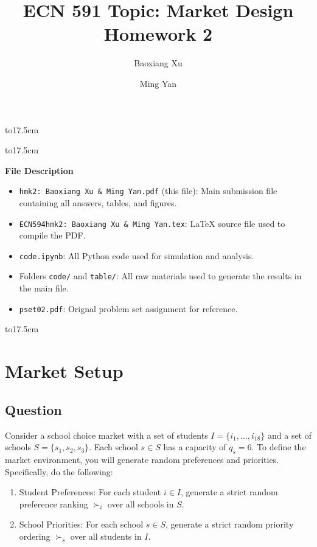 \documentclass[12pt,oneside]{article}
\begin{document}
\setlength{\columnwidth}{17.6cm}
\title{ECN 591 Topic: Market Design\\Homework 2}
\author{Baoxiang Xu \and Ming Yan}
\maketitle
\hbox to17.5cm{\hrulefill}\par
\maketitle
\hbox to17.5cm{\hrulefill}\par

\vspace{0.5cm}

\noindent
\textbf{File Description}

\vspace{0.2cm}

\noindent
\begin{itemize}
    \item \texttt{hmk2: Baoxiang Xu \& Ming Yan.pdf} (this file): Main submission file containing all answers, tables, and figures.
    \item \texttt{ECN594hmk2: Baoxiang Xu \& Ming Yan.tex}: \LaTeX{} source file used to compile the PDF.
    \item \texttt{code.ipynb}: All Python code used for simulation and analysis.
    \item Folders \texttt{code/} and \texttt{table/}: All raw materials used to generate the results in the main file.
    \item \texttt{pset02.pdf}: Orignal problem set assignment for reference.
\end{itemize}
\vspace{0.5cm}
\hbox to17.5cm{\hrulefill}\par

\newpage
\tableofcontents


\newpage
\section{Market Setup}
\subsection{Question}
Consider a school choice market with a set of students $I = \{i_1, \dots, i_{18}\}$ and a set of schools $S = \{s_1, s_2, s_3\}$. Each school $s \in S$ has a capacity of $q_s = 6$. To define the market environment, you will generate random preferences and priorities. Specifically, do the following:
\begin{enumerate}[label=\arabic*.]
    \item Student Preferences: For each student $i \in I$, generate a strict random preference ranking $\succ_i$ over all schools in $S$.
    \item School Priorities: For each school $s \in S$, generate a strict random priority ordering $\succ_s$ over all students in $I$.
\end{enumerate}
\end{document}
